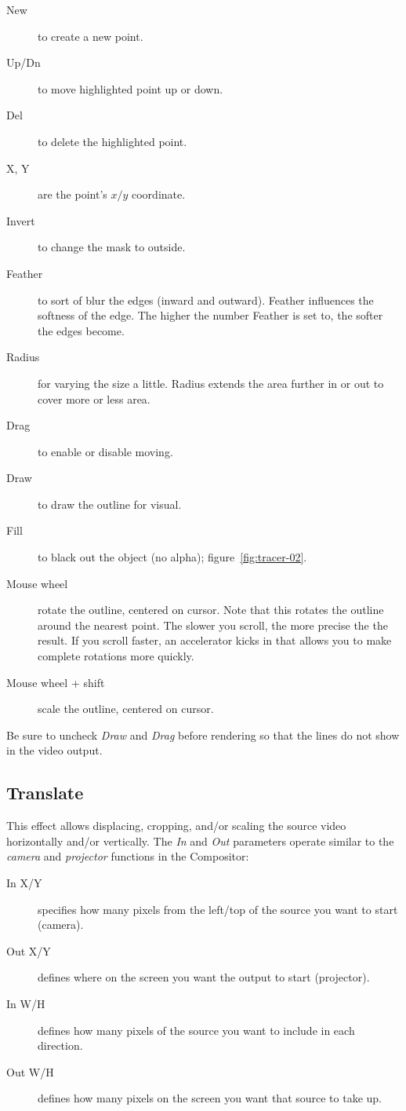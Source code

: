 \begin{description}
	\item[New] to create a new point.
	\item[Up/Dn] to move highlighted point up or down.
	\item[Del] to delete the highlighted point.
	\item[X, Y] are the point’s $x/y$ coordinate.
	\item[Invert] to change the mask to outside.
	\item[Feather] to sort of blur the edges (inward and outward). Feather influences the softness of the edge. The higher the number Feather is set to, the softer the edges become.
	\item[Radius] for varying the size a little. Radius extends the area further in or out to cover more or less area.
	\item[Drag] to enable or disable moving.
	\item[Draw] to draw the outline for visual.
	\item[Fill] to black out the object (no alpha); figure~\ref{fig:tracer-02}.
	\item[Mouse wheel] rotate the outline, centered on cursor. Note that this rotates the outline around the nearest point. The slower you scroll, the more precise the the result. If you scroll faster, an accelerator kicks in that allows you to make complete rotations more quickly.
	\item[Mouse wheel + shift] scale the outline, centered on cursor.
\end{description}

Be sure to uncheck \textit{Draw} and \textit{Drag} before rendering so that the lines do not show in the video output.



\subsection{Translate}%
\label{sub:translate}

This effect allows displacing, cropping, and/or scaling the source video horizontally and/or vertically. The \textit{In} and \textit{Out} parameters operate similar to the \textit{camera} and \textit{projector} functions in the Compositor:

\begin{description}
    \item[In X/Y] specifies how many pixels from the left/top of the source you want to start (camera).
    \item[Out X/Y] defines where on the screen you want the output to start (projector).
    \item[In W/H] defines how many pixels of the source you want to include in each direction.
    \item[Out W/H] defines how many pixels on the screen you want that source to take up.
\end{description}


